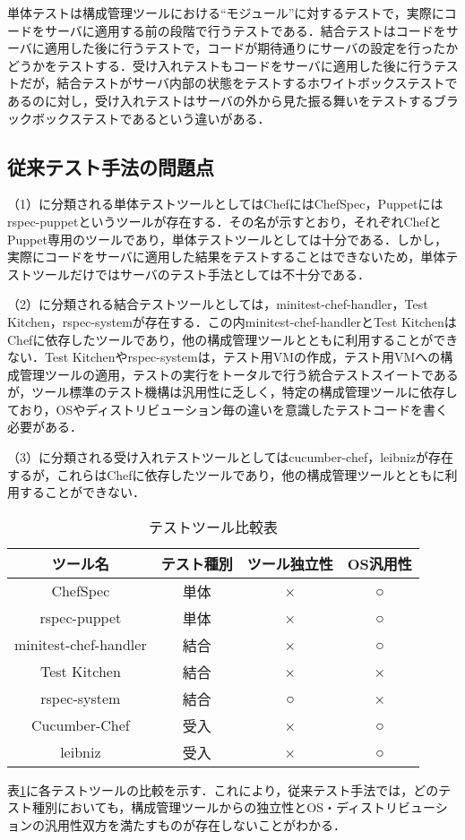 単体テストは構成管理ツールにおける``モジュール''に対するテストで，実際にコードをサーバに適用する前の段階で行うテストである．結合テストはコードをサーバに適用した後に行うテストで，コードが期待通りにサーバの設定を行ったかどうかをテストする．受け入れテストもコードをサーバに適用した後に行うテストだが，結合テストがサーバ内部の状態をテストするホワイトボックステストであるのに対し，受け入れテストはサーバの外から見た振る舞いをテストするブラックボックステストであるという違いがある．

\subsection{従来テスト手法の問題点}

（1）に分類される単体テストツールとしてはChefにはChefSpec，Puppetにはrspec-puppetというツールが存在する．その名が示すとおり，それぞれChefとPuppet専用のツールであり，単体テストツールとしては十分である．しかし，実際にコードをサーバに適用した結果をテストすることはできないため，単体テストツールだけではサーバのテスト手法としては不十分である．

（2）に分類される結合テストツールとしては，minitest-chef-handler，Test Kitchen，rspec-systemが存在する．この内minitest-chef-handlerとTest KitchenはChefに依存したツールであり，他の構成管理ツールとともに利用することができない．Test Kitchenやrspec-systemは，テスト用VMの作成，テスト用VMへの構成管理ツールの適用，テストの実行をトータルで行う統合テストスイートであるが，ツール標準のテスト機構は汎用性に乏しく，特定の構成管理ツールに依存しており，OSやディストリビューション毎の違いを意識したテストコードを書く必要がある．

（3）に分類される受け入れテストツールとしてはcucumber-chef，leibnizが存在するが，これらはChefに依存したツールであり，他の構成管理ツールとともに利用することができない．

\begin{table}[htb]
  \begin{center}
    \caption{テストツール比較表\label{tab:comparison}}
    \begin{tabular}{c|ccc}
      \hline
      \hline
      ツール名 & テスト種別 & ツール独立性 & OS汎用性 \\
      \hline
      ChefSpec              & 単体 & ×  & ○ \\
      \hline
      rspec-puppet          & 単体 & ×  & ○ \\
      \hline
      minitest-chef-handler & 結合 & ×  & ○ \\
      \hline
      Test Kitchen          & 結合 & ×  & × \\
      \hline
      rspec-system          & 結合 & ○ & × \\
      \hline
      Cucumber-Chef         & 受入 & ×  & ○ \\
      \hline
      leibniz               & 受入 & ×  & ○ \\
      \hline
    \end{tabular}
  \end{center}
\end{table}

表\ref{tab:comparison}に各テストツールの比較を示す．これにより，従来テスト手法では，どのテスト種別においても，構成管理ツールからの独立性とOS・ディストリビューションの汎用性双方を満たすものが存在しないことがわかる．
